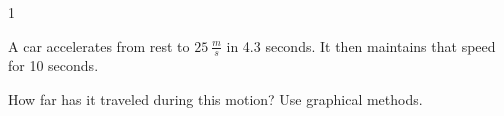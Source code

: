 
\AddToShipoutPicture*{\BackgroundPic}

\addtocounter {ProbNum} {1}

 
{\bf \Large{}} A car accelerates from rest to ${25~\tfrac{m}{s}}$ in 4.3 seconds. It then maintains that speed for 10 seconds.    \bigskip

How far has it traveled during this motion?  Use graphical methods.\vfill




\newpage